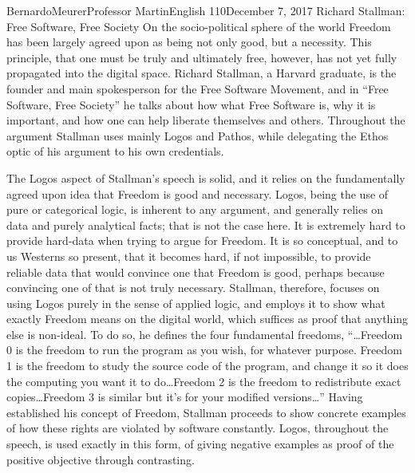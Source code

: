 \documentclass[12pt,letterpaper]{article}
\begin{document}
    \begin{mla}{Bernardo}{Meurer}{Professor Martin}{English 110}{December 7, 2017}%
        {Richard Stallman: Free Software, Free Society}
        On the socio-political sphere of the world Freedom has been largely agreed upon as being not only good, but a necessity. This principle, that one must be truly and ultimately free, however, has not yet fully propagated into the digital space. Richard Stallman, a Harvard graduate, is the founder and main spokesperson for the Free Software Movement, and in ``Free Software, Free Society'' he talks about how what Free Software is, why it is important, and how one can help liberate themselves and others. Throughout the argument Stallman uses mainly Logos and Pathos, while delegating the Ethos optic of his argument to his own credentials.

        The Logos aspect of Stallman's speech is solid, and it relies on the fundamentally agreed upon idea that Freedom is good and necessary. Logos, being the use of pure or categorical logic, is inherent to any argument, and generally relies on data and purely analytical facts; that is not the case here. It is extremely hard to provide hard-data when trying to argue for Freedom. It is so conceptual, and to us Westerns so present, that it becomes hard, if not impossible, to provide reliable data that would convince one that Freedom is good, perhaps because convincing one of that is not truly necessary. Stallman, therefore, focuses on using Logos purely in the sense of applied logic, and employs it to show what exactly Freedom means on the digital world, which suffices as proof that anything else is non-ideal. To do so, he defines the four fundamental freedoms, ``\ldots Freedom 0 is the freedom to run the program as you wish, for whatever purpose. Freedom 1 is the freedom to study the source code of the program, and change it so it does the computing you want it to do\ldots Freedom 2 is the freedom to redistribute exact copies\ldots Freedom 3 is similar but it's for your modified versions\ldots'' Having established his concept of Freedom, Stallman proceeds to show concrete examples of how these rights are violated by software constantly. Logos, throughout the speech, is used exactly in this form, of giving negative examples as proof of the positive objective through contrasting.


\end{mla}
\end{document}
